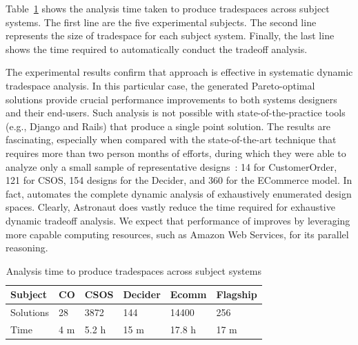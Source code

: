 \documentclass[10pt,conference]{IEEEtran}
\begin{document}
Table~\ref{table:ts_time} shows the analysis time taken to produce tradespaces across subject systems. The first line are the five experimental subjects. The second line represents the size of tradespace for each subject system.  Finally, the last line shows the time required to automatically conduct the tradeoff analysis.





The experimental results confirm that \@approach approach is effective in systematic dynamic tradespace analysis. In this particular case, the generated Pareto-optimal solutions provide crucial performance improvements to both systems designers and their end-users. Such analysis is not possible with state-of-the-practice tools (e.g., Django and Rails) that produce a single point solution.
The results are fascinating, especially when compared with the state-of-the-art technique that requires more than two person months of efforts, during which they were able to analyze only a small sample of representative designs~\cite{trademaker}:  14 for CustomerOrder, 121 for CSOS, 154 designs for the Decider, and 360 for the ECommerce model. In fact, \@approach automates the complete dynamic analysis of exhaustively enumerated design spaces. Clearly, Astronaut does vastly reduce the time required for exhaustive dynamic tradeoff analysis. We expect that performance of \@approach improves by leveraging more capable computing resources, such as Amazon Web Services, for its parallel reasoning.
 

\begin{table}[ht]
\begin{tabular}{l|l|l|l|l|l}
\hline
\hline
Subject & CO & CSOS & Decider & Ecomm & Flagship \\ \hline
Solutions & 28 & 3872 & 144 & 14400 & 256 \\ \hline
Time & 4 m & 5.2 h & 15 m & 17.8 h & 17 m \\ \hline
\hline
\end{tabular}
\caption{Analysis time to produce tradespaces across subject systems}
\label{table:ts_time}
\end{table}
 
\end{document}
